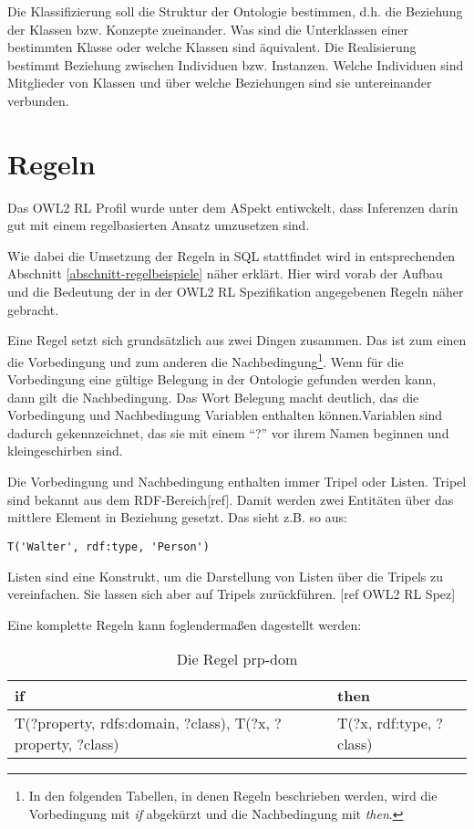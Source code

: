 Die Klassifizierung soll die Struktur der Ontologie bestimmen, d.h. die Beziehung der Klassen bzw. Konzepte zueinander. Was sind die Unterklassen einer bestimmten Klasse oder welche Klassen sind äquivalent.
Die Realisierung bestimmt Beziehung zwischen Individuen bzw. Instanzen. Welche Individuen sind Mitglieder von Klassen und über welche Beziehungen sind sie untereinander verbunden.

\section{Regeln}
Das OWL2 RL Profil wurde unter dem ASpekt entiwckelt, dass Inferenzen darin gut mit einem regelbasierten Ansatz umzusetzen sind.

Wie dabei die Umsetzung der Regeln in SQL stattfindet wird in entsprechenden Abschnitt \ref{abschnitt-regelbeispiele} näher erklärt. Hier wird vorab der Aufbau und die Bedeutung der in der OWL2 RL Spezifikation angegebenen Regeln näher gebracht.

Eine Regel setzt sich grundsätzlich aus zwei Dingen zusammen. Das ist zum einen die Vorbedingung und zum anderen die Nachbedingung\footnote{In den folgenden Tabellen, in denen Regeln beschrieben werden, wird die Vorbedingung mit \emph{if} abgekürzt und die Nachbedingung mit \emph{then}.}. Wenn für die Vorbedingung eine gültige Belegung in der Ontologie gefunden werden kann, dann gilt die Nachbedingung. Das Wort Belegung macht deutlich, das die Vorbedingung und Nachbedingung Variablen enthalten können.Variablen sind dadurch gekennzeichnet, das sie mit einem ``?'' vor ihrem Namen beginnen und kleingeschirben sind.

Die Vorbedingung und Nachbedingung enthalten immer Tripel oder Listen. Tripel sind bekannt aus dem RDF-Bereich[ref]. Damit werden zwei Entitäten über das mittlere Element in Beziehung gesetzt. Das sieht z.B. so aus:
\begin{verbatim}
T('Walter', rdf:type, 'Person')
\end{verbatim}
Listen sind eine Konstrukt, um die Darstellung von Listen über die Tripels zu vereinfachen. Sie lassen sich aber auf Tripels zurückführen. [ref OWL2 RL Spez]

Eine komplette Regeln kann foglendermaßen dagestellt werden:

\begin{table}[htb]
\begin{center}
\begin{tabular}{m{6cm}|m{4cm}}
if & then \\ \hline
T(?property, rdfs:domain, ?class),\newline
T(?x, ?property, ?class) & T(?x, rdf:type, ?class)
\end{tabular}
\end{center}
\caption{Die Regel prp-dom}
\label{rule-prp-dom}
\end{table}

